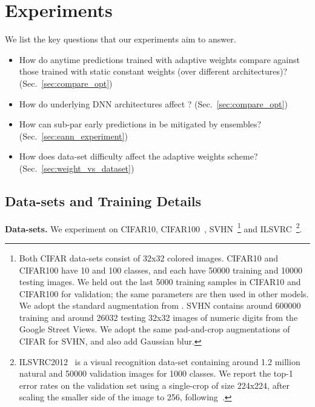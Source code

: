 \section{Experiments}
\label{sec:experiment_questions}

We list the key questions that our experiments aim to answer.
\begin{itemize}

\item How do anytime predictions trained with adaptive weights compare against those trained with static constant weights (over different architectures)?
(Sec.~\ref{sec:compare_opt})
\item How do underlying DNN architectures affect \anns? (Sec.~\ref{sec:compare_opt})
\item How can sub-par early predictions in \anns be mitigated by \ann ensembles? 
(Sec.~\ref{sec:eann_experiment})
\item How does data-set difficulty affect the adaptive weights scheme?
(Sec.~\ref{sec:weight_vs_dataset})
\end{itemize}


\subsection{Data-sets and Training Details}
\label{sec:exp}

\textbf{Data-sets.} We experiment on CIFAR10, CIFAR100~\cite{cifar}, SVHN~\cite{svhn}\footnote{Both CIFAR data-sets consist of 32x32 colored images. CIFAR10 and CIFAR100 have 10 and 100 classes, and each have 50000 training and 10000 testing images. We held out the last 5000 training samples in CIFAR10 and CIFAR100 for validation; the same parameters are then used in other models. We adopt the standard augmentation from \cite{supervisednet,resnet}.
SVHN contains around 600000 training and around 26032 testing 32x32 images of numeric digits from the Google Street Views. We adopt the same pad-and-crop augmentations of CIFAR for SVHN, and also add Gaussian blur.}
and ILSVRC~\cite{ILSVRC15}\footnote{
ILSVRC2012~\cite{ILSVRC15} is a visual recognition data-set containing around 1.2 million natural and 50000 validation images for 1000 classes. We report the top-1 error rates on the validation set using a single-crop of size 224x224, after scaling the smaller side of the image to 256, following~\cite{resnet}.}.

